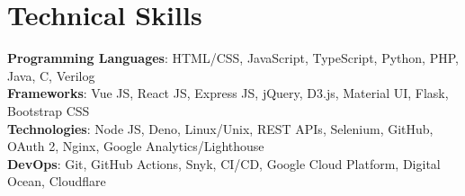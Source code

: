 \section{Technical Skills}
 \begin{itemize}[leftmargin=0.15in, label={}]
    \small{\item{
     \textbf{Programming Languages}{: HTML/CSS, JavaScript, TypeScript, Python, PHP, Java, C, Verilog} \\
     \textbf{Frameworks}{: Vue JS, React JS, Express JS, jQuery, D3.js, Material UI, Flask, Bootstrap CSS } \\
     \textbf{Technologies}{: Node JS, Deno, Linux/Unix, REST APIs, Selenium, GitHub, OAuth 2, Nginx, Google Analytics/Lighthouse } \\
     \textbf{DevOps}{: Git, GitHub Actions, Snyk, CI/CD, Google Cloud Platform, Digital Ocean, Cloudflare }
    }}
 \end{itemize} 